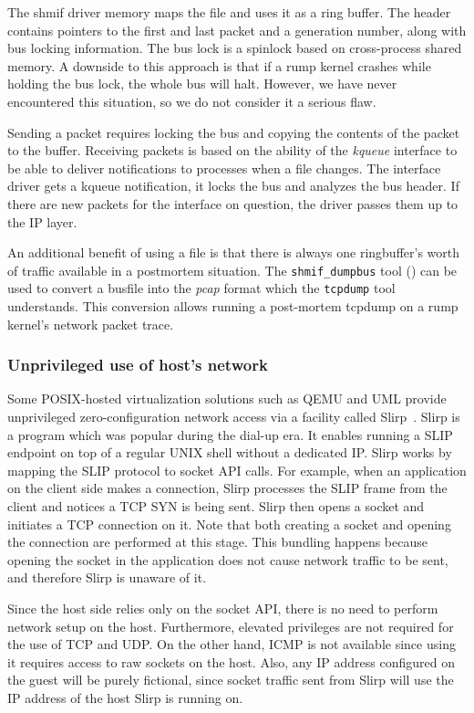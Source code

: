 The shmif driver memory maps the file and uses it as a ring buffer.  The
header contains pointers to the first and last packet and a generation
number, along with bus locking information.  The bus lock is a
spinlock based on cross-process shared memory.  A downside to this
approach is that if a rump kernel crashes while holding the bus
lock, the whole bus will halt.  However, we have never encountered this
situation, so we do not consider it a serious flaw.

Sending a packet requires locking the bus and copying the contents
of the packet to the buffer.  Receiving packets is based on the
ability of the \textit{kqueue}
interface to be able to deliver notifications to processes when a
file changes.  The interface driver gets a kqueue notification, it locks
the bus and analyzes the bus header.  If there are new packets for the
interface on question, the driver passes them up to the IP layer.

An additional benefit of using a file is that there is always one
ringbuffer's worth of traffic available in a postmortem situation.
The \verb+shmif_dumpbus+ tool
() can be used to
convert a busfile into the \textit{pcap} format which the
\texttt{tcpdump} tool understands.  This conversion allows running
a post-mortem tcpdump on a rump kernel's network packet trace.

\subsubsection*{Unprivileged use of host's network}

Some POSIX-hosted virtualization solutions such as QEMU and UML provide
unprivileged zero-configuration network access via a facility called
Slirp~\cite{slirp}.  Slirp is a program which was popular during the
dial-up era.  It enables running a SLIP~\cite{slip} endpoint on top of
a regular UNIX shell without a dedicated IP.  Slirp works by mapping the
SLIP protocol to socket API calls.  For example, when an application on
the client side makes a connection, Slirp processes the SLIP frame from
the client and notices a TCP SYN is being sent.  Slirp then opens a socket
and initiates a TCP connection on it.  Note that both creating a socket
and opening the connection are performed at this stage.  This bundling
happens because opening the socket in the application does not
cause network traffic to be sent, and therefore Slirp is unaware of it.

Since the host side relies only on the socket API, there is no need
to perform network setup on the host.  Furthermore, elevated
privileges are not required for the use of TCP and UDP.  On the
other hand, ICMP is not available since using it requires access
to raw sockets on the host.  Also, any IP address configured on
the guest will be purely fictional, since socket traffic sent from
Slirp will use the IP address of the host Slirp is running on.

